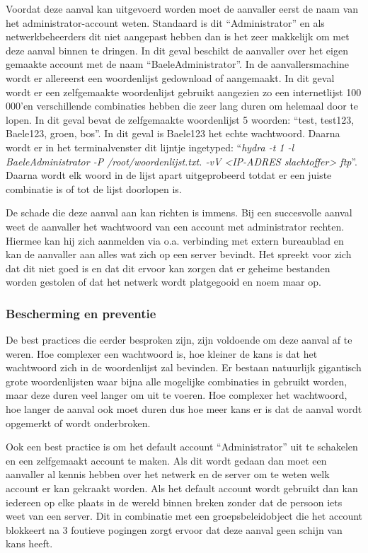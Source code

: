 \documentclass[pdftex,a4paper,12pt]{report}
\begin{document}
Voordat deze aanval kan uitgevoerd worden moet de aanvaller eerst de naam van het administrator-account weten. Standaard is dit "`Administrator"' en als netwerkbeheerders dit niet aangepast hebben dan is het zeer makkelijk om met deze aanval binnen te dringen. In dit geval beschikt de aanvaller over het eigen gemaakte account met de naam "`BaeleAdministrator"'. In de aanvallersmachine wordt er allereerst een woordenlijst gedownload of aangemaakt. In dit geval wordt er een zelfgemaakte woordenlijst gebruikt aangezien zo een internetlijst 100 000'en verschillende combinaties hebben die zeer lang duren om helemaal door te lopen. In dit geval bevat de zelfgemaakte woordenlijst 5 woorden: "`test, test123, Baele123, groen, bos"'. In dit geval is Baele123 het echte wachtwoord. Daarna wordt er in het terminalvenster dit lijntje ingetyped: "`\textit{hydra -t 1 -l BaeleAdministrator -P /root/woordenlijst.txt. -vV <IP-ADRES slachtoffer> ftp}"'. Daarna wordt elk woord in de lijst apart uitgeprobeerd totdat er een juiste combinatie is of tot de lijst doorlopen is. \citep{Moon2013} \newline 

De schade die deze aanval aan kan richten is immens. Bij een succesvolle aanval weet de aanvaller het wachtwoord van een account met administrator rechten. Hiermee kan hij zich aanmelden via o.a. verbinding met extern bureaublad en kan de aanvaller aan alles wat zich op een server bevindt. Het spreekt voor zich dat dit niet goed is en dat dit ervoor kan zorgen dat er geheime bestanden worden gestolen of dat het netwerk wordt platgegooid en noem maar op.

\subsubsection{Bescherming en preventie}
De best practices die eerder besproken zijn, zijn voldoende om deze aanval af te weren. Hoe complexer een wachtwoord is, hoe kleiner de kans is dat het wachtwoord zich in de woordenlijst zal bevinden. Er bestaan natuurlijk gigantisch grote woordenlijsten waar bijna alle mogelijke combinaties in gebruikt worden, maar deze duren veel langer om uit te voeren. Hoe complexer het wachtwoord, hoe langer de aanval ook moet duren dus hoe meer kans er is dat de aanval wordt opgemerkt of wordt onderbroken. \newline 

Ook een best practice is om het default account "`Administrator"' uit te schakelen en een zelfgemaakt account te maken. Als dit wordt gedaan dan moet een aanvaller al kennis hebben over het netwerk en de server om te weten welk account er kan gekraakt worden. Als het default account wordt gebruikt dan kan iedereen op elke plaats in de wereld binnen breken zonder dat de persoon iets weet van een server. Dit in combinatie met een groepsbeleidobject die het account blokkeert na 3 foutieve pogingen zorgt ervoor dat deze aanval geen schijn van kans heeft.
\end{document}
